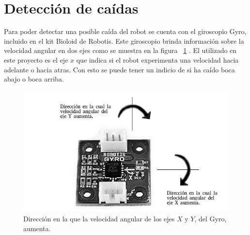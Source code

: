 \section{Detecci\'on de ca\'idas}

Para poder detectar una posible caída del robot se cuenta con el giroscopio Gyro, incluido en el kit Bioloid de Robotis. Este giroscopio brinda información sobre la velocidad angular en dos ejes como se muestra en la figura ~\ref{fig:gyroDireccion} . El utilizado en este proyecto es el eje $x$ que indica si el robot experimenta una velocidad hacia adelante o hacia atras. Con esto se puede tener un indicio de si ha caído boca abajo o boca arriba.   

\begin{figure}[hbtp]
\centering
\includegraphics[scale=0.1]{imagenes/gyroDireccion.jpg}
\caption{Dirección en la que la velocidad angular de los ejes $X$ y $Y$, del Gyro, aumenta.}
\label{fig:gyroDireccion}
\end{figure}